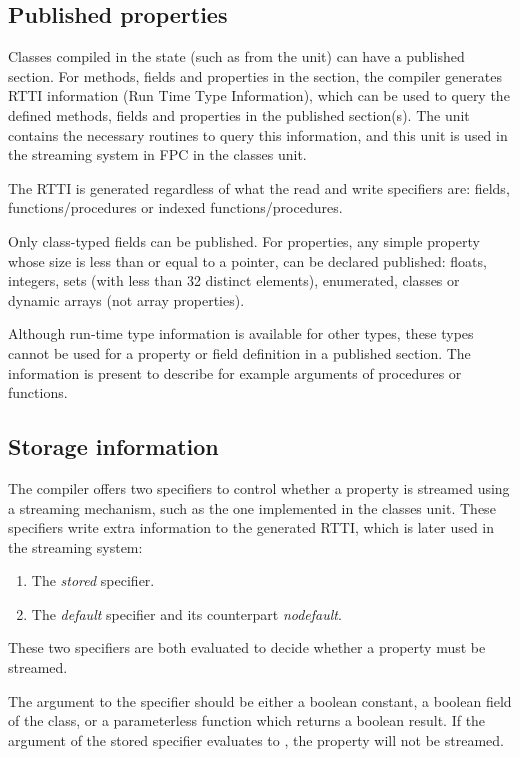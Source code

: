 \subsection{Published properties}
Classes compiled in the  state (such as  from
the  unit) can have a published section. For methods, fields
and properties in the  section, the compiler generates RTTI
information (Run Time Type Information), which can be used to query the
defined methods, fields and properties in the published section(s). The
 unit contains the necessary routines to query this
information, and this unit is used in the streaming system in FPC in the
classes unit.

The RTTI is generated regardless of what the read and write specifiers are:
fields, functions/procedures or indexed functions/procedures.

Only class-typed fields can be published. For properties, any simple property
whose size is less than or equal to a pointer, can be declared published:
floats, integers, sets (with less than 32 distinct elements), enumerated,
classes or dynamic arrays (not array properties).

Although run-time type information is available for other types, these types cannot
be used for a property or field definition in a published section. The
information is present to describe for example arguments of procedures or functions.

\subsection{Storage information}
The compiler offers two specifiers to control whether a property is streamed
using a streaming mechanism, such as the one implemented in the classes
unit. These specifiers write extra information to the generated RTTI, which
is later used in the streaming system:

\begin{enumerate}
\item The {\em stored} specifier.
\item The {\em default} specifier and its counterpart {\em nodefault}.
\end{enumerate}
These two specifiers are both evaluated to decide whether a property must be
streamed.

The argument to the  specifier should be either a boolean constant,
a boolean field of the class, or a parameterless function which returns a boolean
result. If the argument of the stored specifier evaluates to ,
the property will not be streamed.

